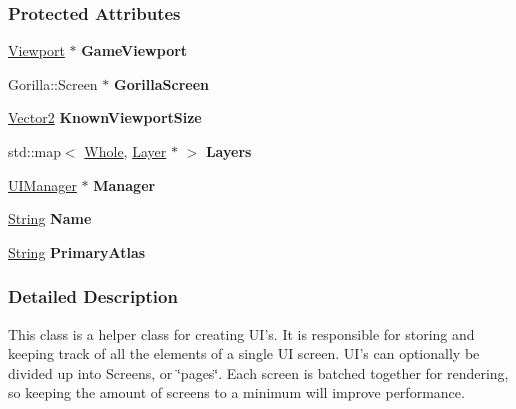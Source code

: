 \subsubsection*{Protected Attributes}
\begin{DoxyCompactItemize}
\item 
\hypertarget{classphys_1_1UI_1_1Screen_a6fbbce53e571b77cc52bdf78a54e5f38}{
\hyperlink{classphys_1_1Viewport}{Viewport} $\ast$ {\bfseries GameViewport}}
\label{classphys_1_1UI_1_1Screen_a6fbbce53e571b77cc52bdf78a54e5f38}

\item 
\hypertarget{classphys_1_1UI_1_1Screen_ac8762cf8cb98bed550d25640cf7fc937}{
Gorilla::Screen $\ast$ {\bfseries GorillaScreen}}
\label{classphys_1_1UI_1_1Screen_ac8762cf8cb98bed550d25640cf7fc937}

\item 
\hypertarget{classphys_1_1UI_1_1Screen_ae62627f276dff5213deb9178bce80be0}{
\hyperlink{classphys_1_1Vector2}{Vector2} {\bfseries KnownViewportSize}}
\label{classphys_1_1UI_1_1Screen_ae62627f276dff5213deb9178bce80be0}

\item 
\hypertarget{classphys_1_1UI_1_1Screen_a1375e2cd9b01a13e47b0ab867245afbb}{
std::map$<$ \hyperlink{namespacephys_a460f6bc24c8dd347b05e0366ae34f34a}{Whole}, \hyperlink{classphys_1_1UI_1_1Layer}{Layer} $\ast$ $>$ {\bfseries Layers}}
\label{classphys_1_1UI_1_1Screen_a1375e2cd9b01a13e47b0ab867245afbb}

\item 
\hypertarget{classphys_1_1UI_1_1Screen_a0a74a8abe7b12bb01bd0a50d5cba722c}{
\hyperlink{classphys_1_1UIManager}{UIManager} $\ast$ {\bfseries Manager}}
\label{classphys_1_1UI_1_1Screen_a0a74a8abe7b12bb01bd0a50d5cba722c}

\item 
\hypertarget{classphys_1_1UI_1_1Screen_a10e62b7ae053e64037868baabe100c4b}{
\hyperlink{namespacephys_aa03900411993de7fbfec4789bc1d392e}{String} {\bfseries Name}}
\label{classphys_1_1UI_1_1Screen_a10e62b7ae053e64037868baabe100c4b}

\item 
\hypertarget{classphys_1_1UI_1_1Screen_ac16a50bdd84ca1a4bda835931490da02}{
\hyperlink{namespacephys_aa03900411993de7fbfec4789bc1d392e}{String} {\bfseries PrimaryAtlas}}
\label{classphys_1_1UI_1_1Screen_ac16a50bdd84ca1a4bda835931490da02}

\end{DoxyCompactItemize}


\subsubsection{Detailed Description}
This class is a helper class for creating UI's. It is responsible for storing and keeping track of all the elements of a single UI screen. UI's can optionally be divided up into Screens, or \char`\"{}pages\char`\"{}. Each screen is batched together for rendering, so keeping the amount of screens to a minimum will improve performance. 

